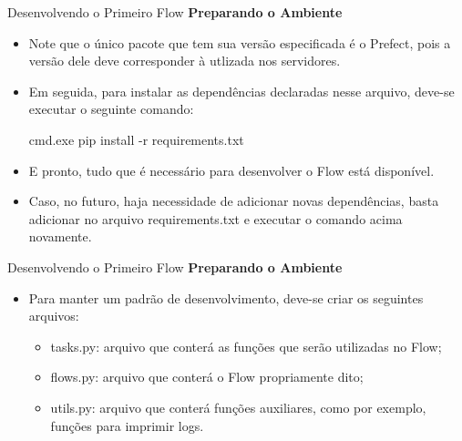 \documentclass[t,serif]{beamer}
\begin{document}
	\begin{frame}{Desenvolvendo o Primeiro Flow}
		\textbf{Preparando o Ambiente}
		\begin{itemize}
			\item Note que o único pacote que tem sua versão especificada é o Prefect, pois a versão dele deve corresponder à utlizada nos servidores.
			\item Em seguida, para instalar as dependências declaradas nesse arquivo, deve-se executar o seguinte comando:
			\begin{block}{cmd.exe}
				pip install -r requirements.txt
			\end{block}
			\item E pronto, tudo que é necessário para desenvolver o Flow está disponível.
			\item Caso, no futuro, haja necessidade de adicionar novas dependências, basta adicionar no arquivo requirements.txt e executar o comando acima novamente.
		\end{itemize}
	\end{frame}
	
	\begin{frame}{Desenvolvendo o Primeiro Flow}
		\textbf{Preparando o Ambiente}
		\vspace{1.5cm}
		\begin{itemize}
			\item Para manter um padrão de desenvolvimento, deve-se criar os seguintes arquivos:
			\begin{itemize}
				\item tasks.py: arquivo que conterá as funções que serão utilizadas no Flow;
				\item flows.py: arquivo que conterá o Flow propriamente dito;
				\item utils.py: arquivo que conterá funções auxiliares, como por exemplo, funções para imprimir logs.
			\end{itemize}
		\end{itemize}
	\end{frame}
	
\end{document}
